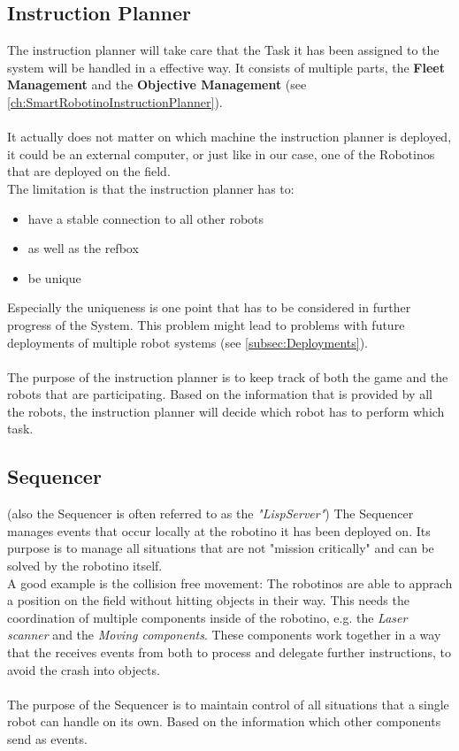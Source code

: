 \subsection{Instruction Planner}
The instruction planner will take care that the Task it has been assigned to the system will be handled
in a effective way. It consists of multiple parts, the \textbf{Fleet Management} and the \textbf{Objective Management} (see \ref{ch:SmartRobotinoInstructionPlanner}). \\
\\
It actually does not matter on which machine the instruction planner is deployed, it could be an external computer,
or just like in our case, one of the Robotinos that are deployed on the field.\\
The limitation is that the instruction planner has to:
\begin{itemize}
    \item have a stable connection to all other robots
    \item as well as the refbox
    \item be unique
\end{itemize}
Especially the uniqueness is one point that has to be considered in further progress of the System.
This problem might lead to problems with future deployments of multiple robot systems (see \ref{subsec:Deployments}). \\
\\
The purpose of the instruction planner is to keep track of both the game and the robots that are participating.
Based on the information that is provided by all the robots, the instruction planner will decide which
robot has to perform which task.

\subsection{Sequencer}
(also the Sequencer is often referred to as the \textit{"LispServer"})
The Sequencer manages events that occur locally at the robotino it has been deployed on.
Its purpose is to manage all situations that are not "mission critically" and can be solved by the robotino itself. \\
A good example is the collision free movement:
The robotinos are able to apprach a position on the field without hitting objects in their way. This needs the coordination of
multiple components inside of the robotino, e.g. the \textit{Laser scanner} and the \textit{Moving components}.
These components work together in a way that the receives events from both to process and delegate further instructions,
to avoid the crash into objects.\\
\\
The purpose of the Sequencer is to maintain control of all situations that a single robot can handle on its own.
Based on the information which other components send as events.

